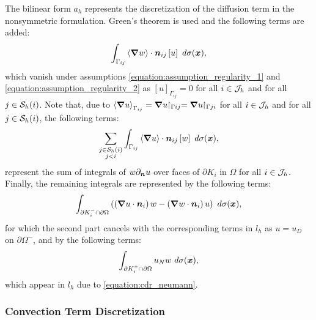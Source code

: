 The bilinear form $a_h$ represents the discretization of the diffusion term in the nonsymmetric formulation. Green's theorem is used and the following terms are added:
\begin{align}
    \int_{\Gamma_{ij}} \left\langle \bm{\nabla} w \right\rangle \cdot \bm{n}_{ij} \left[ u \right] ~ d \sigma(\bm{x}),
\end{align}
which vanish under assumptions \cref{equation:assumption_regularity_1} and \cref{equation:assumption_regularity_2} as $\left[ u \right]_{\Gamma_{ij}} = 0$ for all $i \in \mathcal{J}_h$ and for all $j \in \mathcal{S}_h(i)$. Note that, due to $\left\langle \bm{\nabla} u \right\rangle_{\Gamma_{ij}} = \bm{\nabla} u \!\!\restriction_{\Gamma{ij}} = \bm{\nabla} u \!\!\restriction_{\Gamma{ji}}$ for all $i \in \mathcal{J}_h$ and for all $j \in \mathcal{S}_h(i)$, the following terms:
\begin{align}
    \sum_{\substack{j \in \mathcal{S}_h(i) \\ j < i}} \int_{\Gamma_{ij}} \left\langle \bm{\nabla} u \right\rangle \cdot \bm{n}_{ij} \left[ w \right] ~ d \sigma(\bm{x}),
\end{align}
represent the sum of integrals of $w \partial_{\bm{n}} u$ over faces of $\partial K_i$ in $\Omega$ for all $i \in \mathcal{J}_h$. Finally, the remaining integrals are represented by the following terms:
\begin{align}
    \int_{\partial K_i^- \cap \partial \Omega} \left( \left( \bm{\nabla} u \cdot \bm{n}_i \right) w - \left( \bm{\nabla} w \cdot \bm{n}_i \right) u \right) ~ d \sigma(\bm{x}),
\end{align}
for which the second part cancels with the corresponding terms in $l_h$ as $u = u_D$ on $\partial \Omega^-$, and by the following terms:
\begin{align}
    \int_{\partial K_i^+ \cap \partial \Omega} u_N w ~ d \sigma(\bm{x}),
\end{align}
which appear in $l_h$ due to \cref{equation:cdr_neumann}.

\newpage
\subsubsection{Convection Term Discretization}

